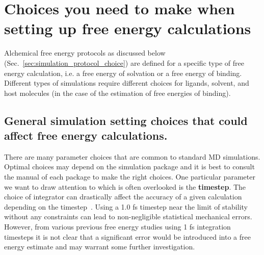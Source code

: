 \documentclass[9pt,bestpractices]{livecoms}
\begin{document}

%
%
\section{Choices you need to make when setting up free energy calculations}
\label{sec:prerequisites}
Alchemical free energy protocols as discussed below (Sec.~\ref{sec:simulation_protocol_choice}) are defined for a specific type of free energy calculation, i.e. a free energy of solvation or a free energy of binding. Different types of simulations require different choices for ligands, solvent, and host molecules (in the case of the estimation of free energies of binding). 

\subsection{General simulation setting choices that could affect free energy calculations.}
There are many parameter choices that are common to standard MD simulations. Optimal choices may depend on the simulation package and it is best to consult the manual of each package to make the right choices. One particular parameter we want to draw attention to which is often overlooked is the \textbf{timestep}. The choice of integrator can drastically affect the accuracy of a given calculation depending on the timestep~\cite{leimkuhler2016efficient}. Using a 1.0 fs timestep near the limit of stability without any constraints can lead to non-negligible statistical mechanical errors. However, from various previous free energy studies using 1 fs integration timesteps it is not clear that a significant error would be introduced into a free energy estimate and may warrant some further investigation.  
\end{document}
